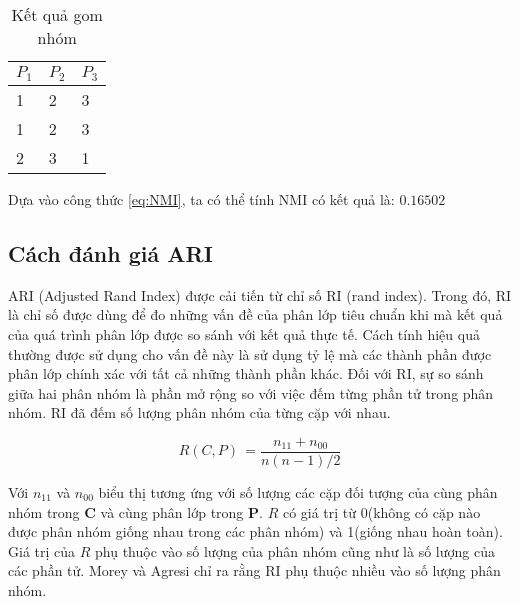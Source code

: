 \begin{table}[ht]
\begin{center}
\begin{tabularx}{\textwidth}{|Y|Y|Y|}
\hline
$P_1$ & $P_2$ & $P_3$\\
 & 2 & 3\\

1 & 2 & 3\\

2 & 3 & 1\\
\hline
\end{tabularx}
\caption[Kết quả gom nhóm]{Kết quả gom nhóm}
\label{bang_4_4}
\end{center}
\end{table}

Dựa vào công thức \ref{eq:NMI}, ta có thể tính NMI có kết quả là: $0.16502$

		
\subsection{Cách đánh giá ARI}
ARI (Adjusted Rand Index) được cải tiến từ chỉ số RI (rand index).
Trong đó, RI là chỉ số được dùng để đo những vấn đề của phân lớp tiêu chuẩn khi mà kết quả của quá trình phân lớp được so sánh với kết quả thực tế.
Cách tính hiệu quả thường được sử dụng cho vấn đề này là sử dụng tỷ lệ mà các thành phần được phân lớp chính xác với tất cả những thành phần khác.
Đối với RI, sự so sánh giữa hai phân nhóm là phần mở rộng so với việc đếm từng phần tử trong phân nhóm.
RI đã đếm số lượng phân nhóm của từng cặp với nhau.
\begin{center}
\begin{equation}
R(C,P) \, = \frac{n_{11} + n_{00}}{n(n - 1) / 2}
\end{equation}
\end{center}

Với $n_{11}$ và $n_{00}$ biểu thị tương ứng với số lượng các cặp đối tượng của cùng phân nhóm trong $\textbf{C}$ và cùng phân lớp trong $\textbf{P}$.
$R$ có giá trị từ 0(không có cặp nào được phân nhóm giống nhau trong các phân nhóm) và 1(giống nhau hoàn toàn).
Giá trị của $R$ phụ thuộc vào số lượng của phân nhóm cũng như là số lượng của các phần tử.
Morey và Agresi chỉ ra rằng RI phụ thuộc nhiều vào số lượng phân nhóm.


